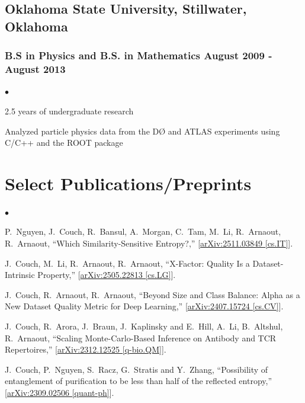 \documentclass[letterpaper]{article}
\renewenvironment{itemize}{
  \begin{list}{$\bullet$}{
    \setlength{\itemsep}{0em}
    \setlength{\parskip}{0em}
    \setlength{\parsep}{0em} 
    \setlength{\topsep}{0em} 
  }
}{
  \end{list}
}
\begin{document}
\subsection*{Oklahoma State University, Stillwater, Oklahoma}
\subsubsection*{B.S in Physics and B.S. in Mathematics \hfill August 2009 - August 2013}
    \begin{itemize}
        \item 2.5 years of undergraduate research
        \item Analyzed particle physics data from the DØ and ATLAS experiments using C/C++ and the ROOT package
    \end{itemize}

\section*{Select Publications/Preprints}

\begin{itemize}

\item
    P.~Nguyen, J.~Couch, R.~Bansul, A.~Morgan, C.~Tam, M.~Li, R.~Arnaout, R.~Arnaout,
    ``Which Similarity-Sensitive Entropy?,''
    [\href{https://arxiv.org/abs/2511.03849}{arXiv:2511.03849 [cs.IT]}].

\item
    J.~Couch, M.~Li, R.~Arnaout, R.~Arnaout,
    ``X-Factor: Quality Is a Dataset-Intrinsic Property,''
    [\href{https://arxiv.org/abs/2505.22813}{arXiv:2505.22813 [cs.LG]}].


\item
    J.~Couch, R.~Arnaout, R.~Arnaout,
    ``Beyond Size and Class Balance: Alpha as a New Dataset Quality Metric for Deep Learning,''
    [\href{https://arxiv.org/abs/2407.15724}{arXiv:2407.15724 [cs.CV]}].
    

\item
    J.~Couch, R.~Arora, J.~Braun, J.~Kaplinsky and E.~Hill, A.~Li, B.~Altshul, R.~Arnaout,
    ``Scaling Monte-Carlo-Based Inference on Antibody and TCR Repertoires,''
    [\href{https://arxiv.org/abs/2312.12525}{arXiv:2312.12525 [q-bio.QM]}].


\item 
    J.~Couch, P.~Nguyen, S.~Racz, G.~Stratis and Y.~Zhang,
    ``Possibility of entanglement of purification to be less than half of the reflected entropy,''
    [\href{https://arxiv.org/abs/2309.02506}{arXiv:2309.02506 [quant-ph]}].

\end{itemize}
\end{document}
